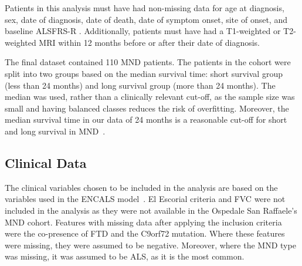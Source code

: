 Patients in this analysis must have had non-missing data for age at diagnosis, sex, date of diagnosis, date of death, date of symptom onset, site of onset, and baseline ALSFRS-R .
Additionally, patients must have had a T1-weighted or T2-weighted MRI within 12 months before or after their date of diagnosis.

The final dataset contained 110 MND patients.
The patients in the cohort were split into two groups based on the median survival time: short survival group (less than 24 months) and long survival group (more than 24 months).
The median was used, rather than a clinically relevant cut-off, as the sample size was small and having balanced classes reduces the risk of overfitting.
Moreover, the median survival time in our data of 24 months is a reasonable cut-off for short and long survival in MND~\cite{feldmanAmyotrophicLateralSclerosis2022}.

\subsection{Clinical Data}

The clinical variables chosen to be included in the analysis are based on the variables used in the ENCALS model~\cite{westenengPrognosisPatientsAmyotrophic2018}.
El Escorial criteria and FVC were not included in the analysis as they were not available in the Ospedale San Raffaele's MND cohort.
Features with missing data after applying the inclusion criteria were the co-presence of FTD and the C9orf72 mutation.
Where these features were missing, they were assumed to be negative.
Moreover, where the MND type was missing, it was assumed to be ALS, as it is the most common.


